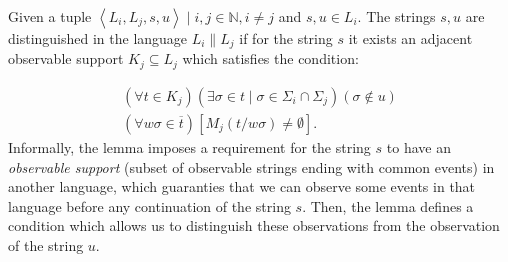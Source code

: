 \begin{lemma}
\label{lem:distinguished}
Given a tuple $\left< L_i, L_j, s, u\right> \mid i, j \in \mathbb{N}, i\neq j$
and $s, u \in L_i$. The strings $s, u$ are
distinguished in the language $L_i \parallel L_j$ if for the string $s$ it
exists an adjacent observable support $K_j \subseteq L_j$ which satisfies the
condition:
\end{lemma} 
\begin{equation}
\label{con:distinquished}
	\begin{array}{l}
	 	(\forall t \in K_j)
	 	(\exists \sigma \in t \mid \sigma \in \Sigma_i \cap \Sigma_j)
	 	(\sigma \not \in u)
	 	\\
	 	(\forall w\sigma \in \overline{t})
	 	[M_j(t / w\sigma) \neq \emptyset].
	\end{array}
\end{equation}
Informally, the lemma imposes a requirement for the string $s$ to have an
\emph{observable support} (subset of observable strings ending with common
events) in another language, which guaranties that we can observe some events in that
language before any continuation of the string $s$.
Then, the lemma defines a condition which allows us to distinguish these
observations from the observation of the string $u$.

